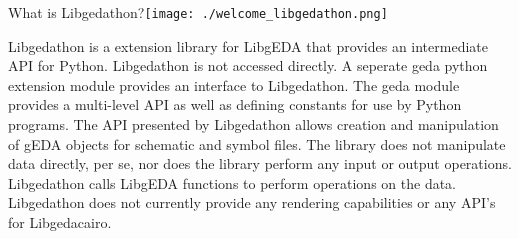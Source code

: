  What is Libgedathon?\texttt{[image: ./welcome\_libgedathon.png]}

  Libgedathon is a extension library for LibgEDA that provides an intermediate API for Python. Libgedathon is not accessed directly. A seperate geda python extension module provides an interface to Libgedathon. The geda module provides a multi-level API as well as defining constants for use by Python programs. The API presented by Libgedathon allows creation and manipulation of gEDA objects for schematic and symbol files. The library does not manipulate data directly, per se, nor does the library perform any input or output operations. Libgedathon calls LibgEDA functions to perform operations on the data. Libgedathon does not currently provide any rendering capabilities or any API's for Libgedacairo.
